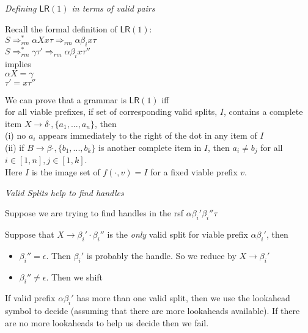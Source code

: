 \frmrule 



\frmrule 


\frmrule 





\textit{Defining $\textsf{LR}(1)$ in terms of valid pairs }

Recall the formal definition of $\textsf{LR}(1)$:\\
$S \Rightarrow^{*}_{rm} \alpha X x\tau \Rightarrow_{rm} \alpha \beta_i x\tau$\\
$S \Rightarrow^{*}_{rm} \gamma \tau' \Rightarrow_{rm} \alpha \beta_i x\tau''$\\
implies\\
$\alpha X = \gamma$\\
$\tau' = x\tau''$

We can prove that a grammar is $\textsf{LR}(1)$ iff\\
for all viable prefixes,
if set of corresponding valid splits, $I$,
contains a complete item $X \rightarrow \delta \cdot, \{a_1,...,a_n\}$, 
then\\ 
(i) no $a_i$ appears immediately to the right of the dot in any item of $I$\\
(ii) if $B \rightarrow \beta \cdot, \{b_1,...,b_k\}$ is another complete item in $I$, then 
$a_i \neq b_j$ for all $i \in [1,n], j \in [1,k]$. \\

Here $I$ is the image set of $f(\cdot, v) = I$ for a fixed viable prefix $v$. 

\frmrule 

\textit{Valid Splits help to find handles }

Suppose we are trying to find handles in the rsf 
$\alpha \beta_{i}' \beta_{i}'' \tau$

Suppose that $X \rightarrow \beta_{i}' \cdot \beta_{i}''$ is 
the \textit{only} valid split for viable prefix $\alpha\beta_{i}'$, 
then 
\begin{itemize}
\item $\beta_{i}'' = \epsilon$. Then $\beta_{i}'$ is probably the handle. So we reduce 
by $X \rightarrow \beta_{i}'$
\item $\beta_{i}'' \neq \epsilon$. Then we shift
\end{itemize}
If valid prefix $\alpha\beta_{i}'$ has more than one valid split, then 
we use the lookahead symbol to decide (assuming that there are more lookaheads available).
If there are no more lookaheads to help us decide then we fail. 

